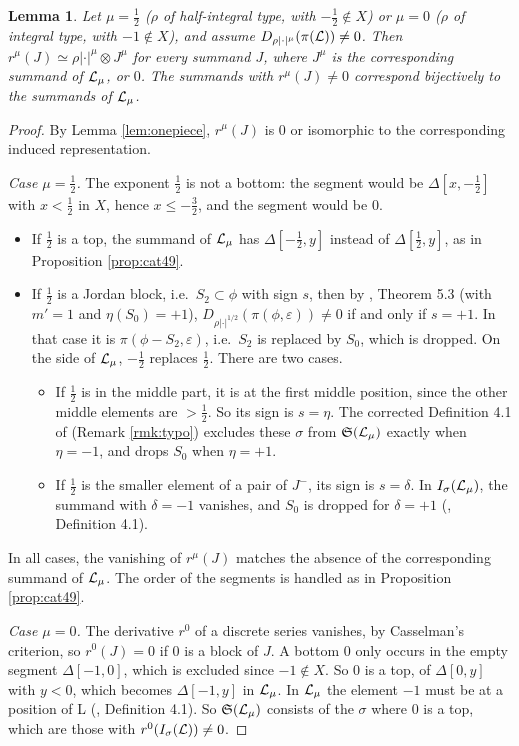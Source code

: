 \documentclass[a4paper,12pt,leqno]{amsart}
\theoremstyle{plain}
\newtheorem{lemma}[thm]{Lemma}
\theoremstyle{definition}
\providecommand{\frS}{\mathfrak{S}}\providecommand{\frs}{\mathfrak{s}}
\begin{document}
\begin{lemma}\label{lem:small} Let $\mu=\tfrac12$ ($\rho$ of half-integral type, with $-\tfrac12\notin X$) or
$\mu=0$ ($\rho$ of integral type, with $-1\notin X$), and assume $D_{\rho|\cdot|^\mu}(\pi(\mathcal{L}))\neq0$.
Then $r^\mu(J)\simeq\rho|\cdot|^\mu\otimes J^\mu$ for every summand $J$, where $J^\mu$ is the
corresponding summand of $\mathcal{L}_\mu$, or $0$. The summands with $r^\mu(J)\neq0$ correspond bijectively to
the summands of $\mathcal{L}_\mu$.
\end{lemma}

\begin{proof}
By Lemma \ref{lem:onepiece}, $r^\mu(J)$ is $0$ or isomorphic to the corresponding induced representation.

\emph{Case $\mu=\tfrac12$.} The exponent $\tfrac12$ is not a bottom: the segment would be $\Delta[x,-\tfrac12]$
with $x<\tfrac12$ in $X$, hence $x\leq-\tfrac32$, and the segment would be $0$.
\begin{itemize}
\item If $\tfrac12$ is a top, the summand of $\mathcal{L}_\mu$ has $\Delta[-\tfrac12,y]$ instead of
$\Delta[\tfrac12,y]$, as in Proposition \ref{prop:cat49}.
\item If $\tfrac12$ is a Jordan block, i.e.\ $S_2\subset\phi$ with sign $s$, then by \cite{AM23},
Theorem 5.3 (with $m'=1$ and $\eta(S_0)=+1$), $D_{\rho|\cdot|^{1/2}}(\pi(\phi,\varepsilon))\neq0$ if and
only if $s=+1$. In that case it is $\pi(\phi-S_2,\varepsilon)$, i.e.\ $S_2$ is replaced by $S_0$, which
is dropped. On the side of $\mathcal{L}_\mu$, $-\tfrac12$ replaces $\tfrac12$. There are two cases.
\begin{itemize}
\item If $\tfrac12$ is in the middle part, it is at the first middle position, since the other middle
elements are $>\tfrac12$. So its sign is $s=\eta$. The corrected Definition 4.1 of \cite{Ato24}
(Remark \ref{rmk:typo}) excludes these $\sigma$ from $\frS(\caL_\mu)$ exactly when $\eta=-1$, and
drops $S_0$ when $\eta=+1$.
\item If $\tfrac12$ is the smaller element of a pair of $J^-$, its sign is $s=\delta$. In
$I_\sigma(\mathcal{L}_\mu)$, the summand with $\delta=-1$ vanishes, and $S_0$ is dropped for $\delta=+1$
(\cite{Ato24}, Definition 4.1).
\end{itemize}
\end{itemize}
In all cases, the vanishing of $r^\mu(J)$ matches the absence of the corresponding summand of
$\mathcal{L}_\mu$. The order of the segments is handled as in Proposition \ref{prop:cat49}.

\emph{Case $\mu=0$.} The derivative $r^0$ of a discrete series vanishes, by Casselman's criterion, so
$r^0(J)=0$ if $0$ is a block of $J$. A bottom $0$ only occurs in the empty segment $\Delta[-1,0]$, which is
excluded since $-1\notin X$. So $0$ is a top, of $\Delta[0,y]$ with $y<0$, which becomes
$\Delta[-1,y]$ in $\mathcal{L}_\mu$. In $\mathcal{L}_\mu$ the element $-1$ must be at a position of L
(\cite{Ato24}, Definition 4.1). So $\frS(\caL_\mu)$ consists of the $\sigma$ where $0$ is a top, which
are those with $r^0(I_\sigma(\mathcal{L}))\neq0$.
\end{proof}
\end{document}
